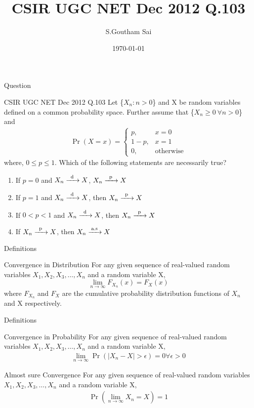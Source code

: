 \documentclass{beamer}
\title{CSIR UGC NET Dec 2012 Q.103}
\author{S.Goutham Sai}
\institute{IITH(CSE)}
\date{\today}
\providecommand{\pr}[1]{\ensuremath{\Pr\left(#1\right)}}
\begin{document}
\begin{frame}
\titlepage
\end{frame}
\begin{frame}{Question}
\begin{block}{CSIR UGC NET Dec 2012 Q.103}
Let \{$X_n: n>0$\} and X be random variables defined on a common probability space. Further assume that \{$X_n \geq 0 \ \forall n > 0$\} and
\begin{align}
\pr{X = x} =\begin{cases}
    p, & x = 0  \\
    1-p, & x =1 \\
     0, &\text{otherwise} 
\end{cases}\end{align}
where, $0 \leq p \leq 1$. Which of the following statements are necessarily true?
\begin{enumerate}
    \item If $p = 0$ and $X_n \ce{->[d]} X$, $X_n \ce{->[p]} X$ 
    \item If $p = 1$ and $X_n \ce{->[d]} X$, then $X_n  \ce{->[p]} X$
    \item If $0<p<1$ and $X_n \ce{->[d]} X$, then $X_n \ce{->[p]} X$
    \item If $X_n \ce{->[p]} X$, then $X_n  \ce{->T[a.s]} X$
\end{enumerate}
\end{block}
\end{frame}

\begin{frame}{Definitions}
\begin{block}{Convergence in Distribution}
    For any given sequence of real-valued random variables $X_1,X_2,X_3, \dots ,X_n$ and a random variable X, 
    \begin{equation}
    \lim_{n \rightarrow \infty} F_{X_n}(x) = F_X(x)
    \end{equation}
    where $F_{X_n}$ and $F_X$ are the cumulative probability distribution functions of $X_n$ and X respectively.
\end{block}    
\end{frame}

\begin{frame}{Definitions}
\begin{block}{Convergence in Probability}
    For any given sequence of real-valued random variables $X_1,X_2,X_3, \dots ,X_n$ and a random variable X,
    \begin{align}
    \lim_{n \rightarrow \infty} \pr{|X_n - X| > \epsilon} = 0 \forall \epsilon > 0
    \end{align}
\end{block}
\begin{block}{Almost sure Convergence}
    For any given sequence of real-valued random variables $X_1,X_2,X_3, \dots ,X_n$ and a random variable X,
    \begin{align}
    \pr{\lim_{n \rightarrow \infty} X_n = X} = 1  
    \end{align}
\end{block}
\end{frame}
\end{document}
